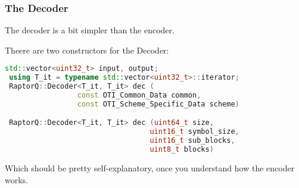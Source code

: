 \documentclass[11pt,a4paper]{refart}
\begin{document}
\subsubsection{The Decoder}

The decoder is a bit simpler than the encoder.

Theere are two constructors for the Decoder:

\begin{lstlisting}[language=C++]
 std::vector<uint32_t> input, output;
 using T_it = typename std::vector<uint32_t>::iterator;
 RaptorQ::Decoder<T_it, T_it> dec (
                 const OTI_Common_Data common,
                 const OTI_Scheme_Specific_Data scheme)

 RaptorQ::Decoder<T_it, T_it> dec (uint64_t size,
                                  uint16_t symbol_size,
                                  uint16_t sub_blocks,
                                  uint8_t blocks)
\end{lstlisting}

Which should be pretty self-explanatory, once you understand how the encoder works.
\end{document}
